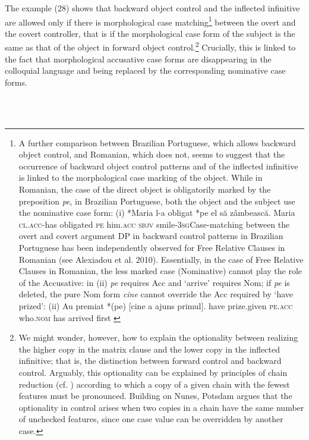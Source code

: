 \documentclass[output=paper]{langsci/langscibook}
\begin{document}
The example (28) shows that backward object control and the inflected infinitive are allowed only if there is morphological case matching\footnote{A further comparison between Brazilian Portuguese, which allows backward object control, and Romanian, which does not, seems to suggest that the occurrence of backward object control patterns and of the inflected infinitive is linked to the morphological case marking of the object. While in Romanian, the case of the direct object is obligatorily marked by the preposition \textit{pe}, in Brazilian Portuguese, both the object and the subject use the nominative case form: (i)  *Maria  l-a     obligat     *pe el            să      zâmbească.  Maria  \textsc{cl.acc}{}-has        obligated     \textsc{pe} him\textsc{.acc} \textsc{sbjv} smile\textsc{{}-3sg}Case-matching between the overt and covert argument DP in backward control patterns in Brazilian Portuguese has been independently observed for Free Relative Clauses in Romanian (see Alexiadou et al. 2010). Essentially, in the case of Free Relative Clauses in Romanian, the less marked case (Nominative) cannot play the role of the Accusative: in (ii) \textit{pe} requires Acc and ‘arrive’ requires Nom; if \textit{pe} is deleted, the pure Nom form \textit{cine} cannot override the Acc required by ‘have prized’: (ii)  Au    premiat       *(pe)     [cine        a     ajuns    primul].  have prize.given   \textsc{pe.acc}  who.\textsc{nom} has arrived first \citep{AlexiadouEtAl2010}} between the overt and the covert controller, that is if the morphological case form of the subject is the same as that of the object in forward object control.\footnote{We might wonder, however, how to explain the optionality between realizing the higher copy in the matrix clause and the lower copy in the inflected infinitive; that is, the distinction between forward control and backward control. Arguably, this optionality can be explained by principles of chain reduction (cf. \citealt{Nunes2004}) according to which a copy of a given chain with the fewest features must be pronounced. Building on Nunes, Potsdam argues that the optionality in control arises when two copies in a chain have the same number of unchecked features, since one case value can be overridden by another case.} Crucially, this is linked to the fact that morphological accusative case forms are disappearing in the colloquial language and being replaced by the corresponding nominative case forms.

\ea%
    \label{ex:moreno:29}
    \gll\\
        \\
    \glt
    \z
\end{document}
